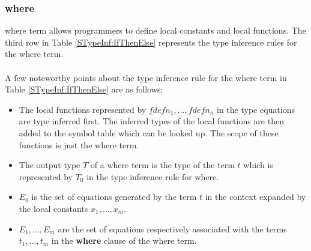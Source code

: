 \documentclass[11pt]{article}
\begin{document}
\subsubsection {where}
{\sf where} term allows programmers to define local constants and local functions. The third row in Table \ref {STypeInf:IfThenElse} represents the type inference rules for the {\sf where} term.
~~\\~~\\ 
A few noteworthy points about the type inference rule for the {\sf where} term in Table \ref {STypeInf:IfThenElse} are as follows:
\begin{itemize}
  \item The local functions represented by ${fdefn_1,\ldots,fdefn_n}$ in the type equations are type inferred first. The inferred types of the local functions are then added to the symbol table which can be looked up. The scope of these functions is just the {\sf where} term.
  \item The output type ${T}$ of a {\sf where} term is the type of the term ${t}$ which is represented by ${T_0}$ in the type inference rule for {\sf where}.
  \item ${E_0}$ is the set of equations generated by the term ${t}$ in the context expanded by the local constants ${x_1,\ldots,x_m}$.
  \item ${E_1,\ldots,E_m}$ are the set of equations respectively associated with the terms ${t_1,\ldots,t_m}$ in the {\bf where} clause of the {\sf where} term.
\end{itemize}
\end{document}
